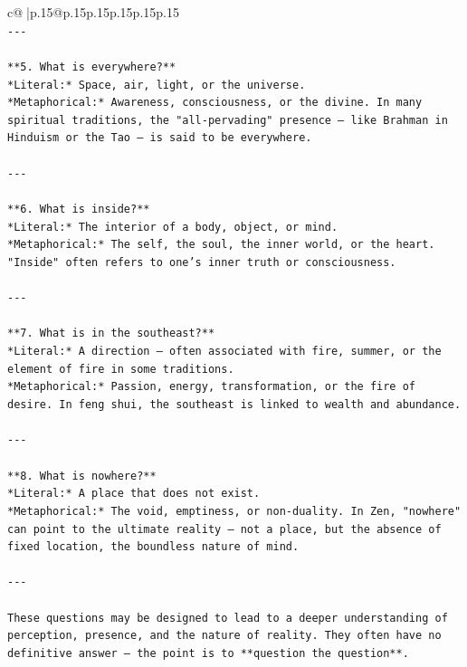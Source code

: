 \documentclass{article}
\begin{document}
{\begin{supertabular}{c@{$\;$}|p{.15\linewidth}@{}p{.15\linewidth}p{.15\linewidth}p{.15\linewidth}p{.15\linewidth}p{.15\linewidth}}
{{{\\ 
\texttt{{-}{-}{-}} \\
\\ 
\texttt{**5. What is everywhere?**  } \\
\texttt{*Literal:* Space, air, light, or the universe.  } \\
\texttt{*Metaphorical:* Awareness, consciousness, or the divine. In many spiritual traditions, the "all{-}pervading" presence — like Brahman in Hinduism or the Tao — is said to be everywhere.} \\
\\ 
\texttt{{-}{-}{-}} \\
\\ 
\texttt{**6. What is inside?**  } \\
\texttt{*Literal:* The interior of a body, object, or mind.  } \\
\texttt{*Metaphorical:* The self, the soul, the inner world, or the heart. "Inside" often refers to one's inner truth or consciousness.} \\
\\ 
\texttt{{-}{-}{-}} \\
\\ 
\texttt{**7. What is in the southeast?**  } \\
\texttt{*Literal:* A direction — often associated with fire, summer, or the element of fire in some traditions.  } \\
\texttt{*Metaphorical:* Passion, energy, transformation, or the fire of desire. In feng shui, the southeast is linked to wealth and abundance.} \\
\\ 
\texttt{{-}{-}{-}} \\
\\ 
\texttt{**8. What is nowhere?**  } \\
\texttt{*Literal:* A place that does not exist.  } \\
\texttt{*Metaphorical:* The void, emptiness, or non{-}duality. In Zen, "nowhere" can point to the ultimate reality — not a place, but the absence of fixed location, the boundless nature of mind.} \\
\\ 
\texttt{{-}{-}{-}} \\
\\ 
\texttt{These questions may be designed to lead to a deeper understanding of perception, presence, and the nature of reality. They often have no definitive answer — the point is to **question the question**.} \\
}}}
\end{supertabular}}
\end{document}
